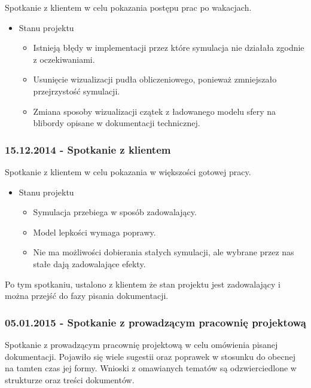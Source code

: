 \documentclass[polish, 12pt]{aghthesis}
\begin{document}
			Spotkanie z klientem w celu pokazania postępu prac po wakacjach. 
			
			\begin{itemize}
			\item Stanu projektu
				\begin{itemize}
					\item Istnieją błędy w implementacji przez które symulacja nie działała zgodnie z oczekiwaniami.
					\item Usunięcie wizualizacji pudła obliczeniowego, ponieważ zmniejszało przejrzystość symulacji.
					\item Zmiana sposoby wizualizacji czątek z ładowanego modelu sfery na blibordy opisane w dokumentacji technicznej.
				\end{itemize}
			\end{itemize}
			
		
		\subsubsection*{15.12.2014 - Spotkanie z klientem}
		
			Spotkanie z klientem w celu pokazania w większości gotowej pracy.
			
			\begin{itemize}
			\item Stanu projektu
				\begin{itemize}
					\item Symulacja przebiega w sposób zadowalający.
					\item Model lepkości wymaga poprawy.
					\item Nie ma możliwości dobierania stałych symulacji, ale wybrane przez nas stałe dają zadowalające efekty.
				\end{itemize}
			\end{itemize}
			
			Po tym spotkaniu, ustalono z klientem że stan projektu jest zadowalający i można przejść do fazy pisania dokumentacji.
			
		\subsubsection*{05.01.2015 - Spotkanie z prowadzącym pracownię projektową}
		
		Spotkanie z prowadzącym pracownię projektową w celu omówienia pisanej dokumentacji. Pojawiło się wiele sugestii oraz poprawek w stosunku do obecnej na tamten czas jej formy. Wnioski z omawianych tematów są odzwierciedlone w strukturze oraz treści dokumentów.
		
\end{document}
